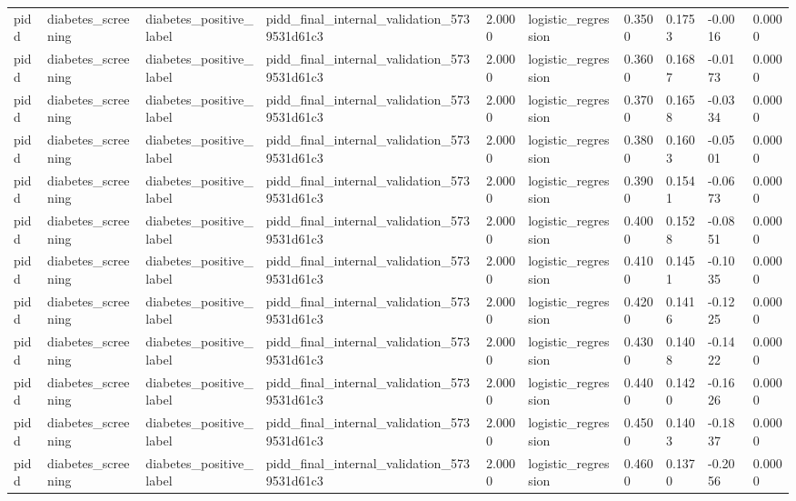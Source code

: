 \begin{tabular}{llllllllll}
pidd & diabetes\_screening & diabetes\_positive\_label & pidd\_final\_internal\_validation\_5739531d61c3 & 2.0000 & logistic\_regression & 0.3500 & 0.1753 & -0.0016 & 0.0000 \\
pidd & diabetes\_screening & diabetes\_positive\_label & pidd\_final\_internal\_validation\_5739531d61c3 & 2.0000 & logistic\_regression & 0.3600 & 0.1687 & -0.0173 & 0.0000 \\
pidd & diabetes\_screening & diabetes\_positive\_label & pidd\_final\_internal\_validation\_5739531d61c3 & 2.0000 & logistic\_regression & 0.3700 & 0.1658 & -0.0334 & 0.0000 \\
pidd & diabetes\_screening & diabetes\_positive\_label & pidd\_final\_internal\_validation\_5739531d61c3 & 2.0000 & logistic\_regression & 0.3800 & 0.1603 & -0.0501 & 0.0000 \\
pidd & diabetes\_screening & diabetes\_positive\_label & pidd\_final\_internal\_validation\_5739531d61c3 & 2.0000 & logistic\_regression & 0.3900 & 0.1541 & -0.0673 & 0.0000 \\
pidd & diabetes\_screening & diabetes\_positive\_label & pidd\_final\_internal\_validation\_5739531d61c3 & 2.0000 & logistic\_regression & 0.4000 & 0.1528 & -0.0851 & 0.0000 \\
pidd & diabetes\_screening & diabetes\_positive\_label & pidd\_final\_internal\_validation\_5739531d61c3 & 2.0000 & logistic\_regression & 0.4100 & 0.1451 & -0.1035 & 0.0000 \\
pidd & diabetes\_screening & diabetes\_positive\_label & pidd\_final\_internal\_validation\_5739531d61c3 & 2.0000 & logistic\_regression & 0.4200 & 0.1416 & -0.1225 & 0.0000 \\
pidd & diabetes\_screening & diabetes\_positive\_label & pidd\_final\_internal\_validation\_5739531d61c3 & 2.0000 & logistic\_regression & 0.4300 & 0.1408 & -0.1422 & 0.0000 \\
pidd & diabetes\_screening & diabetes\_positive\_label & pidd\_final\_internal\_validation\_5739531d61c3 & 2.0000 & logistic\_regression & 0.4400 & 0.1420 & -0.1626 & 0.0000 \\
pidd & diabetes\_screening & diabetes\_positive\_label & pidd\_final\_internal\_validation\_5739531d61c3 & 2.0000 & logistic\_regression & 0.4500 & 0.1403 & -0.1837 & 0.0000 \\
pidd & diabetes\_screening & diabetes\_positive\_label & pidd\_final\_internal\_validation\_5739531d61c3 & 2.0000 & logistic\_regression & 0.4600 & 0.1370 & -0.2056 & 0.0000 \\

\end{tabular}
